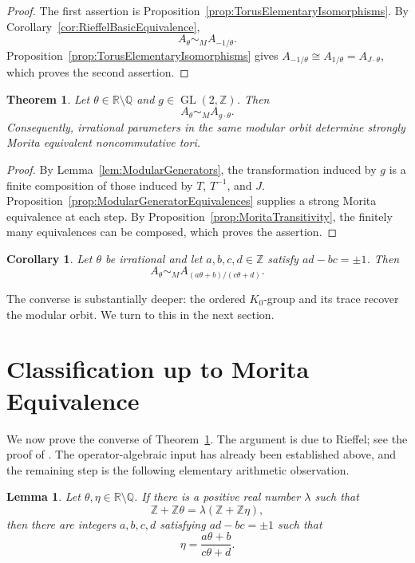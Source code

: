 \documentclass{book}
\newtheorem{lemma}[definition]{Lemma}
\newtheorem{theorem}[definition]{Theorem}
\newtheorem{corollary}[definition]{Corollary}
\begin{document}
\begin{proof}
  The first assertion is Proposition~\ref{prop:TorusElementaryIsomorphisms}.
  By Corollary~\ref{cor:RieffelBasicEquivalence},
  \[
    A_\theta\sim_M A_{-1/\theta}.
  \]
  Proposition~\ref{prop:TorusElementaryIsomorphisms} gives
  \(A_{-1/\theta}\cong A_{1/\theta}=A_{J\cdot\theta}\), which proves the
  second assertion.
\end{proof}

\begin{theorem}\label{thm:ModularOrbitMorita}
  Let \(\theta\in\mathbb R\setminus\mathbb Q\) and
  \(g\in\operatorname{GL}(2,\mathbb Z)\).  Then
  \[
    A_\theta\sim_M A_{g\cdot\theta}.
  \]
  Consequently, irrational parameters in the same modular orbit determine
  strongly Morita equivalent noncommutative tori.
\end{theorem}

\begin{proof}
  By Lemma~\ref{lem:ModularGenerators}, the transformation induced by \(g\)
  is a finite composition of those induced by \(T\), \(T^{-1}\), and \(J\).
  Proposition~\ref{prop:ModularGeneratorEquivalences} supplies a strong
  Morita equivalence at each step.  By
  Proposition~\ref{prop:MoritaTransitivity}, the finitely many equivalences
  can be composed, which proves the assertion.
\end{proof}

\begin{corollary}\label{cor:FractionalLinearMorita}
  Let \(\theta\) be irrational and let \(a,b,c,d\in\mathbb Z\) satisfy
  \(ad-bc=\pm1\).  Then
  \[
    A_\theta\sim_M
    A_{(a\theta+b)/(c\theta+d)}.
  \]
\end{corollary}

The converse is substantially deeper: the ordered \(K_0\)-group and its
trace recover the modular orbit.  We turn to this in the next section.

\section{Classification up to Morita Equivalence}

We now prove the converse of Theorem~\ref{thm:ModularOrbitMorita}.  The
argument is due to Rieffel; see the proof of
\cite[Theorem~4, pp.~421--425]{Rieffel1981}.  The operator-algebraic input has
already been established above, and the remaining step is the following
elementary arithmetic observation.

\begin{lemma}\label{lem:TraceRangeModularOrbit}
  Let \(\theta,\eta\in\mathbb R\setminus\mathbb Q\). If there is a positive
  real number \(\lambda\) such that
  \[
    \mathbb Z+\mathbb Z\theta
      =\lambda(\mathbb Z+\mathbb Z\eta),
  \]
  then there are integers \(a,b,c,d\) satisfying \(ad-bc=\pm1\) such that
  \[
    \eta=\frac{a\theta+b}{c\theta+d}.
  \]
\end{lemma}
\end{document}
